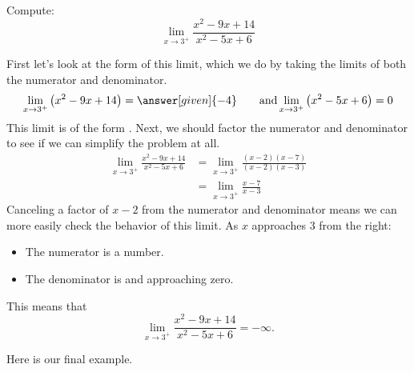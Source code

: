 \documentclass{ximera}
\begin{document}
\begin{example}
  Compute:
  \[
  \lim_{x\to 3^+} \frac{x^2-9x+14}{x^2-5x+6}
  \]
  \begin{explanation}
    First let's look at the form of this limit, which we do by taking the limits of both the numerator and denominator.
    \[
    \lim_{x\to 3^+} \left(x^2-9x+14\right) = \answer[given]{-4}\qquad\text{and}\lim_{x\to3^+}\left(x^2-5x+6\right) = 0
    \]
    This limit is of the form \numOverZero. Next, we should factor the numerator and denominator to see if we can simplify the problem at all. 
    \begin{align*}
      \lim_{x\to 3^+}\frac{x^2-9x+14}{x^2-5x+6} &= \lim_{x\to 3^+}\frac{(x-2)(x-7)}{(x-2)(x-3)}\\
      &= \lim_{x\to 3^+}\frac{x-7}{x-3}
    \end{align*}
    Canceling a factor of $x-2$ from the numerator and denominator
    means we can more easily check the behavior of this limit.  As $x$
    approaches $3$ from the right:
    \begin{itemize}
    \item The numerator is a  number. 
    \item The denominator is  and approaching zero.
    \end{itemize}
    This means that
    \[
    \lim_{x\to 3^+} \frac{x^2-9x+14}{x^2-5x+6} = -\infty.
    \]
   \end{explanation}
\end{example}

Here is our final example.
\end{document}
